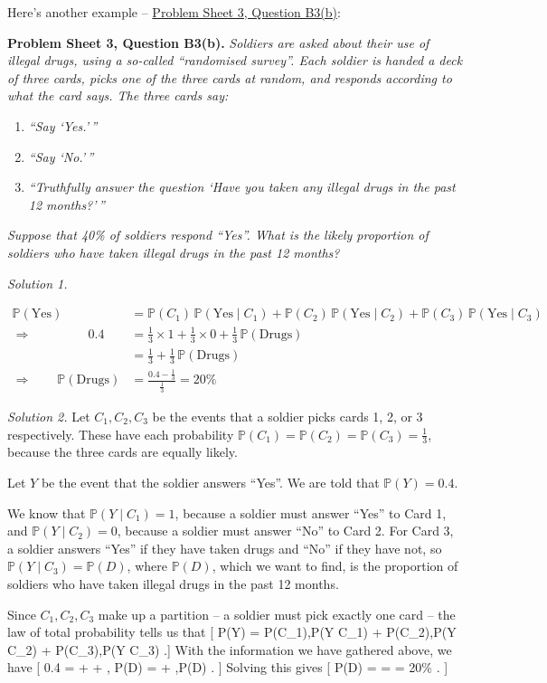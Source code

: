 \documentclass[
  letterpaper,
  DIV=11,
  numbers=noendperiod]{scrreprt}
\providecommand{\tightlist}{%
  \setlength{\itemsep}{0pt}\setlength{\parskip}{0pt}}\usepackage{longtable,booktabs,array}
\theoremstyle{remark}
\begin{document}
Here's another example -- \protect\hyperlink{P3-long}{Problem Sheet 3,
Question B3(b)}:

\textbf{Problem Sheet 3, Question B3(b).} \emph{Soldiers are asked about
their use of illegal drugs, using a so-called ``randomised survey''.
Each soldier is handed a deck of three cards, picks one of the three
cards at random, and responds according to what the card says. The three
cards say:}

\begin{enumerate}
\def\labelenumi{\arabic{enumi}.}
\tightlist
\item
  \emph{``Say `Yes.'\,''}
\item
  \emph{``Say `No.'\,''}
\item
  \emph{``Truthfully answer the question `Have you taken any illegal
  drugs in the past 12 months?'\,''}
\end{enumerate}

\emph{Suppose that 40\% of soldiers respond ``Yes''. What is the likely
proportion of soldiers who have taken illegal drugs in the past 12
months?}

\emph{Solution 1.}

\begin{align*} \mathbb P(\text{Yes}) &= \mathbb P(C_1)\,\mathbb P(\text{Yes} \mid C_1) + \mathbb P(C_2)\,\mathbb P(\text{Yes} \mid C_2) + 
\mathbb P(C_3)\,\mathbb P(\text{Yes} \mid C_3) \\
\Rightarrow \qquad\qquad\  \  0.4 &= \tfrac13 \times 1 + \tfrac13 \times 0 + \tfrac13 \, \mathbb P(\text{Drugs}) \\
&=\tfrac13 + \tfrac13 \,\mathbb P(\text{Drugs})  \\
\Rightarrow \qquad \mathbb P(\text{Drugs}) &= \frac{0.4 - \frac13}{\frac13} = 20\%
\end{align*}

\emph{Solution 2.} Let \(C_1, C_2, C_3\) be the events that a soldier
picks cards 1, 2, or 3 respectively. These have each probability
\(\mathbb P(C_1) = \mathbb P(C_2) = \mathbb P(C_3) = \frac13\), because
the three cards are equally likely.

Let \(Y\) be the event that the soldier answers ``Yes''. We are told
that \(\mathbb P(Y) = 0.4\).

We know that \(\mathbb P(Y \mid C_1) = 1\), because a soldier must
answer ``Yes'' to Card 1, and \(\mathbb P(Y \mid C_2) = 0\), because a
soldier must answer ``No'' to Card 2. For Card 3, a soldier answers
``Yes'' if they have taken drugs and ``No'' if they have not, so
\(\mathbb P(Y \mid C_3) = \mathbb P(D)\), where \(\mathbb P(D)\), which
we want to find, is the proportion of soldiers who have taken illegal
drugs in the past 12 months.

Since \(C_1, C_2, C_3\) make up a partition -- a soldier must pick
exactly one card -- the law of total probability tells us that {[}
\mathbb P(Y) = \mathbb P(C\_1),\mathbb P(Y \mid C\_1) +
\mathbb P(C\_2),\mathbb P(Y \mid C\_2) + \mathbb P(C\_3),\mathbb P(Y
\mid C\_3) .{]} With the information we have gathered above, we have {[}
0.4 =   +   +  , \mathbb P(D) =
 +  ,\mathbb P(D) . {]} Solving this gives {[}
\mathbb P(D) =  =  = 20\% . {]}
\end{document}
